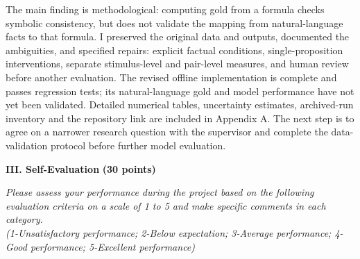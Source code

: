 \documentclass[11pt,a4paper]{article}
\newcommand{\sect}[2]{\textbf{#1} \textbf{(#2 points)}\par}
\newcommand{\hint}[1]{{\small\itshape #1}\par}
\begin{document}
The main finding is methodological: computing gold from a formula checks symbolic consistency, but does not validate the mapping from natural-language facts to that formula. I preserved the original data and outputs, documented the ambiguities, and specified repairs: explicit factual conditions, single-proposition interventions, separate stimulus-level and pair-level measures, and human review before another evaluation. The revised offline implementation is complete and passes regression tests; its natural-language gold and model performance have not yet been validated. Detailed numerical tables, uncertainty estimates, archived-run inventory and the repository link are included in Appendix A. The next step is to agree on a narrower research question with the supervisor and complete the data-validation protocol before further model evaluation.

\bigskip
\sect{III. Self-Evaluation}{30}
\hint{Please assess your performance during the project based on the following evaluation criteria on a scale of 1 to 5 and make specific comments in each category.\\
(1-Unsatisfactory performance; 2-Below expectation; 3-Average performance; 4-Good performance; 5-Excellent performance)}
\end{document}
